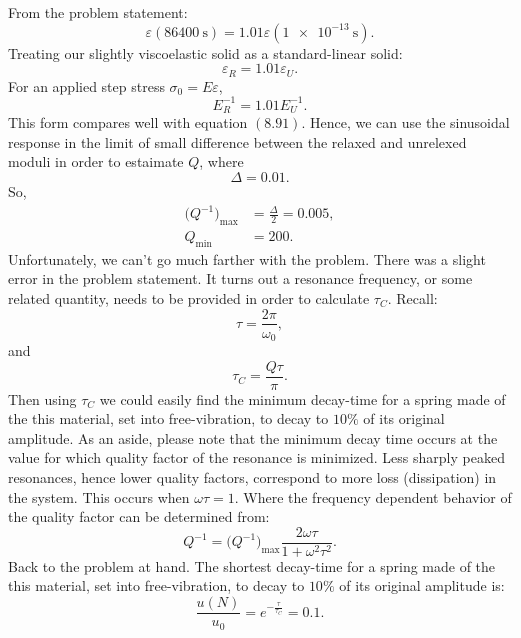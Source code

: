 \documentclass[12pt]{article}
\begin{document}
From the problem statement:
\begin{equation}
  \varepsilon(\SI{86400}{\second}) = 1.01 \varepsilon(\SI{1e-13}{\second}).
\end{equation}
Treating our slightly viscoelastic solid as a standard-linear solid:
\begin{equation}
  \varepsilon_{R} = 1.01 \varepsilon_{U}.
\end{equation}
For an applied step stress $\sigma_{0} = E \varepsilon$,
\begin{equation}
  E_{R}^{-1} = 1.01 E_{U}^{-1}.
\end{equation}
This form compares well with equation $(8.91)$. Hence, we can use the sinusoidal response in the limit of
small difference between the relaxed and unrelexed moduli in order to estaimate $Q$, where
\begin{equation}
  \Delta = 0.01.
\end{equation}
So,
\begin{align}
  \big( Q^{-1} \big)_\text{max} & = \frac{ \Delta }{ 2 } = 0.005, \\
  Q_\text{min}                  & = 200.
\end{align}
Unfortunately, we can’t go much farther with the problem. There was a slight error in the problem
statement. It turns out a resonance frequency, or some related quantity, needs to be provided in order
to calculate $\tau_C$. Recall:
\begin{equation}
  \tau = \frac{ 2 \pi }{ \omega_0 },
\end{equation}
and
\begin{equation}
  \tau_C = \frac{ Q \tau }{ \pi }.
\end{equation}
Then using $\tau_C$ we could easily find the minimum decay-time for a spring made of the this material,
set into free-vibration, to decay to $10\%$ of its original amplitude. As an aside, please note that the
minimum decay time occurs at the value for which quality factor of the resonance is minimized. Less
sharply peaked resonances, hence lower quality factors, correspond to more loss (dissipation) in the
system. This occurs when $\omega \tau = 1$. Where the frequency dependent behavior of the quality factor can
be determined from:
\begin{equation}
  Q^{-1} = \big( Q^{-1} \big)_\text{max} \frac{ 2 \omega \tau }{ 1 + \omega^2 \tau^2 }.
\end{equation}
Back to the problem at hand. The shortest decay-time for a spring made of the this material, set into
free-vibration, to decay to $10\%$ of its original amplitude is:
\begin{equation}
  \frac{ u(N) }{ u_0 } = e^{-\frac{ \tau }{ \tau_C }} = 0.1.
\end{equation}
\end{document}
